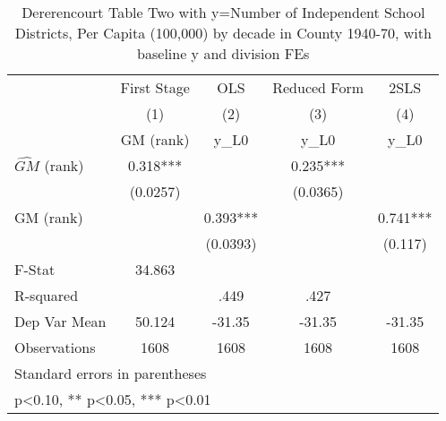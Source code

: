 \begin{table}[htbp]\centering
\def\sym#1{\ifmmode^{#1}\else\(^{#1}\)\fi}
\caption{Dererencourt Table Two with y=Number of Independent School Districts, Per Capita (100,000) by decade in County 1940-70, with baseline y and division FEs}
\begin{tabular}{l*{4}{c}}
\toprule
                    & First Stage   &         OLS   &Reduced Form   &        2SLS   \\
                    &\multicolumn{1}{c}{(1)}&\multicolumn{1}{c}{(2)}&\multicolumn{1}{c}{(3)}&\multicolumn{1}{c}{(4)}\\
                    &\multicolumn{1}{c}{GM  (rank)}&\multicolumn{1}{c}{y\_L0}&\multicolumn{1}{c}{y\_L0}&\multicolumn{1}{c}{y\_L0}\\
\midrule
$\hat{GM}$ (rank)   &       0.318***&               &       0.235***&               \\
                    &    (0.0257)   &               &    (0.0365)   &               \\
\addlinespace
GM  (rank)          &               &       0.393***&               &       0.741***\\
                    &               &    (0.0393)   &               &     (0.117)   \\
\midrule
F-Stat              &      34.863   &               &               &               \\
R-squared           &               &        .449   &        .427   &               \\
Dep Var Mean        &      50.124   &      -31.35   &      -31.35   &      -31.35   \\
Observations        &        1608   &        1608   &        1608   &        1608   \\
\bottomrule
\multicolumn{5}{l}{\footnotesize Standard errors in parentheses}\\
\multicolumn{5}{l}{\footnotesize * p<0.10, ** p<0.05, *** p<0.01}\\
\end{tabular}
\end{table}
